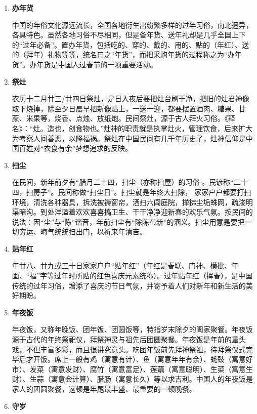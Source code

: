 \begin{enumerate}
    
\item \textbf{办年货}

中国的年俗文化源远流长，全国各地衍生出纷繁多样的过年习俗，南北迥异，各具特色。虽然各地习俗不尽相同，但是备年货、送年礼却是几乎全国上下的“过年必备”。置办年货，包括吃的、穿的、戴的、用的、贴的（年红）、送的（拜年）礼物等等，统名曰之“年货”，而把采购年货的过程称之为“办年货”。办年货是中国人过春节的一项重要活动。

\item \textbf{祭灶}

农历十二月廿三/廿四日祭灶，是日入夜后要把灶台刷干净，把旧的灶君神像取下烧掉，除至夕日晨早把新像贴上，一送一迎，都要摆置酒肉、糖果、甘蔗、米果等，烧香、点烛、放纸炮。民间祭灶，源于古人拜火习俗。《释名》：“灶。造也，创食物也。”灶神的职责就是执掌灶火，管理饮食，后来扩大为考察人间善恶，以降福祸。祭灶在中国民间有几千年历史了，灶神信仰是中国百姓对“衣食有余”梦想追求的反映。

\item  \textbf{扫尘}

在民间，新年前夕有“腊月二十四，扫尘（亦称扫屋）的习俗 。民谚称“二十四，扫房子”。民间称做“扫尘日”。扫尘就是年终大扫除， 家家户户都要打扫环境，清洗各种器具，拆洗被褥窗帘，洒扫六闾庭院，掸拂尘垢蛛网，疏浚明渠暗沟。到处洋溢着欢欢喜喜搞卫生、干干净净迎新春的欢乐气氛。按民间的说法：因“尘”与“陈”谐音，年前扫尘有“除陈布新”的涵义。扫尘用意是要把一切穷运、晦气统统扫出门，以祈来年清吉。

\item \textbf{贴年红}

年廿八、廿九或三十日家家户户“贴年红”（年红是春联、门神、横批、年画、“福”字等过年时所贴的红色喜庆元素统称）。过年贴年红（挥春），是中国传统的过年习俗，增添了喜庆的节日气氛，并寄予着人们对新年和新生活的美好期盼。

\item \textbf{年夜饭}

年夜饭，又称年晚饭、团年饭、团圆饭等，特指岁末除夕的阖家聚餐。年夜饭源于古代的年终祭祀仪，拜祭神灵与祖先后团圆聚餐。年夜饭是年前的重头戏，不但丰富多彩，而且很讲究意头。吃团年饭前先拜神祭祖，待拜祭仪式完毕后才开饭。席上一般有鸡（寓意有计）、鱼（寓意年年有余）、蚝豉（寓意好市）、发菜（寓意发财）、腐竹（寓意富足）、莲藕（寓意聪明）、生菜（寓意生财）、生蒜（寓意会计算）、腊肠（寓意长久）等以求吉利。中国人的年夜饭是家人的团圆聚餐，这顿是年尾最丰盛、最重要的一顿晚餐。

\item \textbf{守岁}


\end{enumerate}
